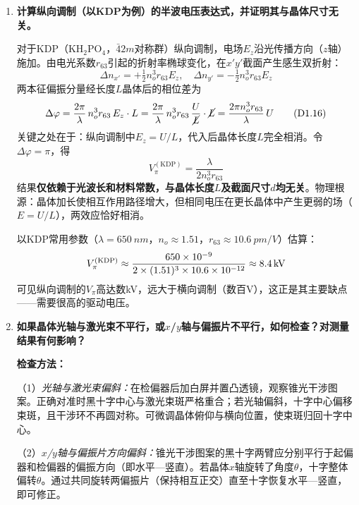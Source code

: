 \documentclass[a4paper,8pt,twocolumn]{article}
\begin{document}
\begin{enumerate}

\item \textbf{计算纵向调制（以KDP为例）的半波电压表达式，并证明其与晶体尺寸无关。}

对于KDP（KH$_2$PO$_4$，$\bar{4}2m$对称群）纵向调制，电场$E_z$沿光传播方向（$z$轴）施加。由电光系数$r_{63}$引起的折射率椭球变化，在$x'y'$截面产生感生双折射：
\begin{equation}
  \Delta n_{x'} = +\tfrac{1}{2}n_o^3r_{63}E_z,\quad
  \Delta n_{y'} = -\tfrac{1}{2}n_o^3r_{63}E_z
  \tag{D1.15}
\end{equation}
两本征偏振分量经长度$L$晶体后的相位差为
\begin{equation}
  \Delta\varphi = \frac{2\pi}{\lambda}\,n_o^3 r_{63}\,E_z\cdot L
  = \frac{2\pi}{\lambda}\,n_o^3 r_{63}\,\frac{U}{\cancel{L}}\cdot \cancel{L}
  = \frac{2\pi n_o^3 r_{63}}{\lambda}\,U
  \tag{D1.16}
\end{equation}
关键之处在于：纵向调制中$E_z = U/L$，代入后晶体长度$L$完全相消。令$\Delta\varphi=\pi$，得
\begin{equation}
  \boxed{V_\pi^{(\mathrm{KDP})} = \frac{\lambda}{2n_o^3 r_{63}}}
  \tag{D1.17}
\end{equation}
结果\textbf{仅依赖于光波长和材料常数，与晶体长度$L$及截面尺寸$d$均无关}。物理根源：晶体加长使相互作用路径增大，但相同电压在更长晶体中产生更弱的场（$E=U/L$），两效应恰好相消。

以KDP常用参数（$\lambda=\SI{650}{nm}$，$n_o\approx1.51$，$r_{63}\approx\SI{10.6}{pm/V}$）估算：
\begin{equation}
  V_\pi^{(\mathrm{KDP})} \approx \frac{650\times10^{-9}}{2\times(1.51)^3\times10.6\times10^{-12}}
  \approx \SI{8.4}{kV}
  \notag
\end{equation}
可见纵向调制的$V_\pi$高达数kV，远大于横向调制（数百V），这正是其主要缺点——需要很高的驱动电压。

\item \textbf{如果晶体光轴与激光束不平行，或$x$/$y$轴与偏振片不平行，如何检查？对测量结果有何影响？}

\textbf{检查方法：}

（1）\textit{光轴与激光束偏斜：}在检偏器后加白屏并置凸透镜，观察锥光干涉图案。正确对准时黑十字中心与激光束斑严格重合；若光轴偏斜，十字中心偏移束斑，且干涉环不再圆对称。可微调晶体俯仰与横向位置，使束斑归回十字中心。

（2）\textit{$x$/$y$轴与偏振片方向偏斜：}锥光干涉图案的黑十字两臂应分别平行于起偏器和检偏器的偏振方向（即水平—竖直）。若晶体$x$轴旋转了角度$\theta$，十字整体偏转$\theta$。通过共同旋转两偏振片（保持相互正交）直至十字恢复水平—竖直，即可修正。


\end{enumerate}
\end{document}
